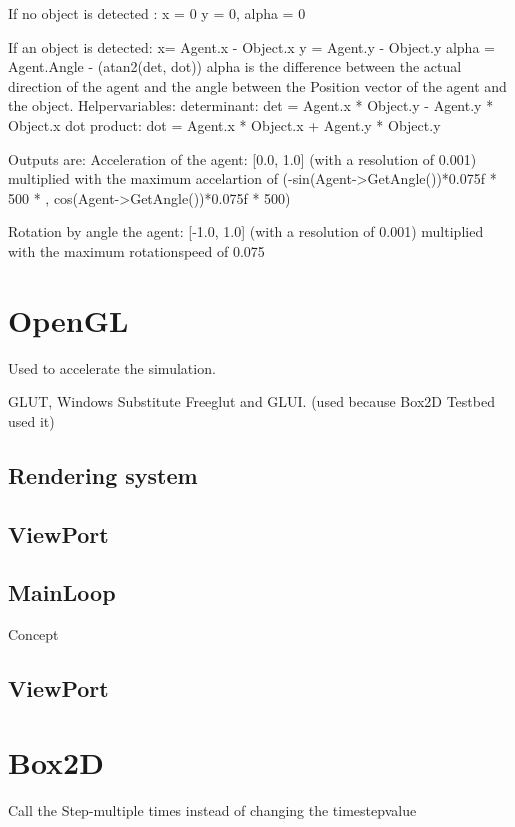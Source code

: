 \documentclass[10pt,a4paper,DIV=11]{scrreprt}
\begin{document}
If no object is detected :
x = 0
y = 0,
alpha = 0 

If an object is detected:
x= Agent.x - Object.x  
y = Agent.y - Object.y
alpha = Agent.Angle - (atan2(det, dot)) 
alpha is the difference between the actual direction of the agent and
the angle between the Position vector of the agent and the object. 
Helpervariables:
determinant: det =  Agent.x * Object.y - Agent.y * Object.x 
dot product:  dot =  Agent.x * Object.x + Agent.y * Object.y 


Outputs are:
Acceleration of the agent: [0.0, 1.0] (with a resolution of 0.001)
multiplied with the maximum accelartion of 
(-sin(Agent->GetAngle())*0.075f * 500 * ,  cos(Agent->GetAngle())*0.075f * 500)

Rotation by angle the agent: [-1.0, 1.0] (with a resolution of 0.001)
multiplied with the maximum rotationspeed of 0.075



\section{OpenGL}
Used to accelerate the simulation.


GLUT, Windows Substitute Freeglut and GLUI. (used because Box2D Testbed used it)

\subsection{Rendering system}

\subsection{ViewPort}

\subsection{MainLoop}

Concept

\subsection{ViewPort}

\section{Box2D}

Call the Step-multiple times instead of changing the timestepvalue
\end{document}
